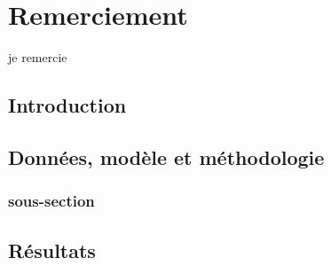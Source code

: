 \documentclass[10pt,a4paper,openright]{report}
\begin{document}
\begin{titlepage}
\begin{figure}
\begin{center}
    
   
 \maketitle %
  		
   \end{center}
 
  \end{figure}
     
 \end{titlepage}

\chapter*{Remerciement}
\begin{center}
je remercie
\end{center}
	\renewcommand{\contentsname}{Sommaire}
	\tableofcontents
	\newpage
\section*{Introduction}
\newpage
\section{Données, modèle et méthodologie}
\subsection{sous-section}





\newpage
\section{Résultats}
\end{document}
